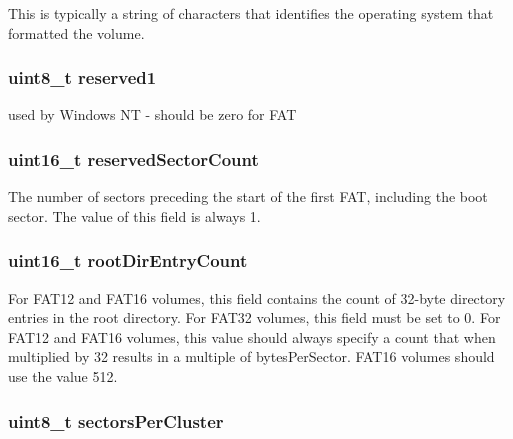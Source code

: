 This is typically a string of characters that identifies the operating system that formatted the volume. \hypertarget{structfat__boot_a2a2556147677ece60b8aadf4a0d608ed}{
\subsubsection[{reserved1}]{\setlength{\rightskip}{0pt plus 5cm}uint8\-\_\-t reserved1}}\label{structfat__boot_a2a2556147677ece60b8aadf4a0d608ed}
used by Windows N\-T -\/ should be zero for F\-A\-T \hypertarget{structfat__boot_a16c854faf567331bbbfb383e6c8df6f5}{
\subsubsection[{reserved\-Sector\-Count}]{\setlength{\rightskip}{0pt plus 5cm}uint16\-\_\-t reserved\-Sector\-Count}}\label{structfat__boot_a16c854faf567331bbbfb383e6c8df6f5}
The number of sectors preceding the start of the first F\-A\-T, including the boot sector. The value of this field is always 1. \hypertarget{structfat__boot_aabe25e54b9c06a9a7393fc6c475d9fa1}{
\subsubsection[{root\-Dir\-Entry\-Count}]{\setlength{\rightskip}{0pt plus 5cm}uint16\-\_\-t root\-Dir\-Entry\-Count}}\label{structfat__boot_aabe25e54b9c06a9a7393fc6c475d9fa1}
For F\-A\-T12 and F\-A\-T16 volumes, this field contains the count of 32-\/byte directory entries in the root directory. For F\-A\-T32 volumes, this field must be set to 0. For F\-A\-T12 and F\-A\-T16 volumes, this value should always specify a count that when multiplied by 32 results in a multiple of bytes\-Per\-Sector. F\-A\-T16 volumes should use the value 512. \hypertarget{structfat__boot_a3ce07376c286acd8393a18a32d7ca4c0}{
\subsubsection[{sectors\-Per\-Cluster}]{\setlength{\rightskip}{0pt plus 5cm}uint8\-\_\-t sectors\-Per\-Cluster}}\label{structfat__boot_a3ce07376c286acd8393a18a32d7ca4c0}
